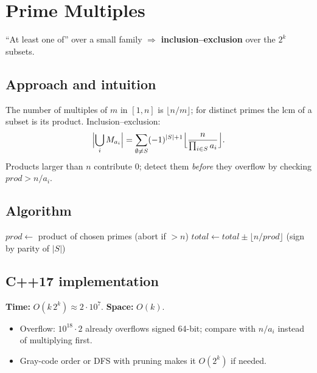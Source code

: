 \section{Prime Multiples}
\label{sec:n-prime-multiples}


\begin{patternbox}
``At least one of'' over a small family $\Rightarrow$
\textbf{inclusion--exclusion} over the $2^k$ subsets.
\end{patternbox}

\subsection*{Approach and intuition}

The number of multiples of $m$ in $[1,n]$ is $\lfloor n/m\rfloor$; for distinct
primes the lcm of a subset is its product. Inclusion--exclusion:
\[
  \Bigl|\bigcup_i M_{a_i}\Bigr|=\sum_{\emptyset\ne S}(-1)^{|S|+1}
  \Bigl\lfloor\frac{n}{\prod_{i\in S}a_i}\Bigr\rfloor .
\]
Products larger than $n$ contribute $0$; detect them \emph{before} they
overflow by checking $prod>n/a_i$.

\subsection*{Algorithm}
\begin{algorithmic}[1]
  \State $prod\gets$ product of chosen primes (abort if $>n$)
  \State $total\gets total\pm\lfloor n/prod\rfloor$ (sign by parity of $|S|$)
\EndFor
\end{algorithmic}


\subsection*{C++17 implementation}

\begin{complexitybox}
\textbf{Time:} $O(k\,2^k)\approx2\cdot10^7$. \textbf{Space:} $O(k)$.
\end{complexitybox}

\begin{pitfallbox}
\begin{itemize}
  \item Overflow: $10^{18}\cdot2$ already overflows signed 64-bit; compare
        with $n/a_i$ instead of multiplying first.
  \item Gray-code order or DFS with pruning makes it $O(2^k)$ if needed.
\end{itemize}
\end{pitfallbox}
